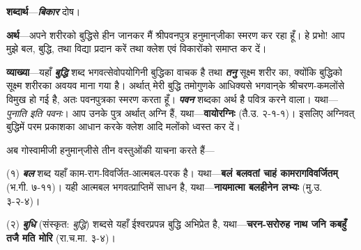 \parasepone
{}
\begin{sloppypar}\justifying{}
\textbf{शब्दार्थ}—\textbf{\textit{बिकार}} {} दोष।
\end{sloppypar}
\begin{sloppypar}\justifying{}
\textbf{अर्थ}—अपने शरीरको बुद्धिसे हीन जानकर मैं श्रीपवनपुत्र हनुमान्‌जीका स्मरण कर रहा हूँ। हे प्रभो! आप मुझे बल, बुद्धि, तथा विद्या प्रदान करें तथा क्लेश एवं विकारोंको समाप्त कर दें।
\end{sloppypar}
\parasepone
\begin{sloppypar}\justifying{}
\textbf{व्याख्या}—यहाँ \textbf{\textit{बुद्धि}} शब्द भगवत्सेवोपयोगिनी बुद्धिका वाचक है तथा \textbf{\textit{तनु}} सूक्ष्म शरीर का, क्योंकि बुद्धिको सूक्ष्म शरीरका अवयव माना गया है। अर्थात् मेरी बुद्धि तमोगुणके आधिक्यसे भगवान्‌के श्रीचरण-कमलोंसे विमुख हो गई है, अतः पवनपुत्रका स्मरण करता हूँ। \textbf{\textit{पवन}} शब्दका अर्थ है पवित्र करने वाला। यथा—\textit{पुनाति इति पवनः}। आप उनके पुत्र अर्थात् अग्नि हैं, यथा—\textbf{वायोरग्निः} (तै.उ. २-१-१)। इसलिए अग्निवत् बुद्धिमें परम प्रकाशका आधान करके क्लेश आदि मलोंको ध्वस्त कर दें।
\end{sloppypar}
\begin{sloppypar}\justifying{}
अब गोस्वामीजी हनुमान्‌जीसे तीन वस्तुओंकी याचना करते हैं—
\end{sloppypar}
\begin{sloppypar}\justifying{}
(१) \textbf{\textit{बल}} शब्द यहाँ काम-राग-विवर्जित-आत्मबल-परक है। यथा—\textbf{बलं बलवतां चाहं कामरागविवर्जितम्} (भ.गी. ७-११)। यही आत्मबल भगवत्प्राप्तिमें साधन है, यथा—\textbf{नायमात्मा बलहीनेन लभ्यः} (मु.उ. ३-२-४)।
\end{sloppypar}
\begin{sloppypar}\justifying{}
(२) \textbf{\textit{बुधि}} (संस्कृत: \textit{बुद्धि}) शब्दसे यहाँ ईश्वर\-प्रपन्न बुद्धि अभिप्रेत है, यथा—\textbf{चरन-सरोरुह नाथ जनि कबहुँ तजै मति मोरि} (रा.च.मा. ३-४)।
\end{sloppypar}

